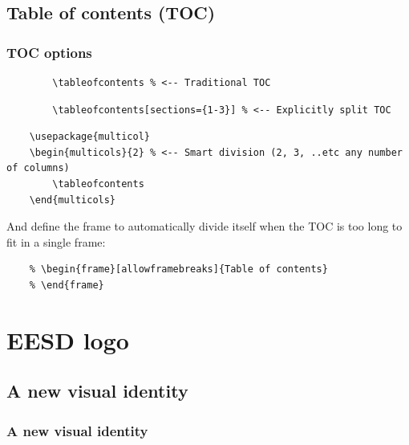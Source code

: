 \documentclass{EESD}
\begin{document}
\subsection{Table of contents (TOC)}
\begin{frame}[fragile]
\frametitle{TOC options}
    \vspace{5pt}
    \begin{lstlisting}
        \tableofcontents % <-- Traditional TOC
    \end{lstlisting}
    \vspace{5pt}
    \begin{lstlisting}
        \tableofcontents[sections={1-3}] % <-- Explicitly split TOC
    \end{lstlisting}
    \vspace{5pt}
    \begin{lstlisting}
    \usepackage{multicol}
    \begin{multicols}{2} % <-- Smart division (2, 3, ..etc any number of columns)
        \tableofcontents
    \end{multicols}
    \end{lstlisting}
    \vspace{5pt}
    And define the frame to automatically divide itself when the TOC is too long to fit in a single frame:
    \begin{lstlisting}
    % \begin{frame}[allowframebreaks]{Table of contents}
    % \end{frame}
    \end{lstlisting}
\end{frame}

\section{EESD logo}
\subsection{A new visual identity}
\begin{frame}
\frametitle{A new visual identity}
\end{frame}
\end{document}
